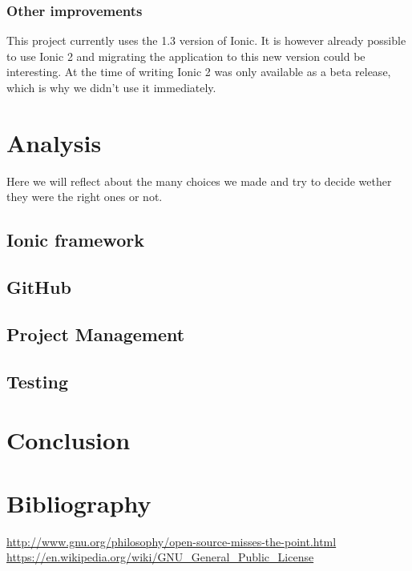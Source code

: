 \documentclass[11pt, a4paper]{report}
\begin{document}
\subsection{Other improvements}
This project currently uses the 1.3 version of Ionic. It is however already possible to use Ionic 2 and migrating the application to this new version could be interesting. At the time of writing Ionic 2 was only available as a beta release, which is why we didn't use it immediately. 


\chapter{Analysis}

Here we will reflect about the many choices we made and try to decide wether they were the right ones or not.

\section{Ionic framework}

\section{GitHub}

\section{Project Management}

\section{Testing}


\chapter{Conclusion} 

\chapter{Bibliography}

\url{http://www.gnu.org/philosophy/open-source-misses-the-point.html}\\
\url{https://en.wikipedia.org/wiki/GNU_General_Public_License}\\
\end{document}
